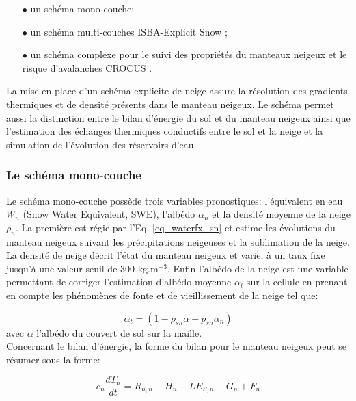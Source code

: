 \begin{itemize}
\item[$\bullet$] un schéma mono-couche;
\medbreak
\item[$\bullet$] un schéma multi-couches ISBA-Explicit Snow \citep[ES,][]{boone2001};
\medbreak
\item[$\bullet$] un schéma complexe pour le suivi des propriétés du manteaux neigeux et le risque d'avalanches CROCUS \citep{vionnet2012}.
\end{itemize}
\medbreak
La mise en place d'un schéma explicite de neige assure la résolution des gradients thermiques et de densité présents dans le manteau neigeux. Le schéma permet aussi la distinction entre le bilan d'énergie du sol et du manteau neigeux ainsi que l'estimation des échanges thermiques conductifs entre le sol et la neige et la simulation de l'évolution des réservoirs d'eau.

\subsubsection{\selectfont Le schéma mono-couche}

Le schéma mono-couche possède trois variables pronostiques: l'équivalent en eau $W_{n}$ (Snow Water Equivalent, SWE), l'albédo $\alpha_{n}$ et la densité moyenne de la neige $\rho_{n}$.
La première est régie par l'Eq. \eqref{eq_waterfx_sn} et estime les évolutions du manteau neigeux  suivant les précipitations neigeuses et la sublimation de la neige. La densité de neige décrit l'état du manteau neigeux et varie, à un taux fixe \citep{verseghy1991} jusqu'à une valeur seuil de 300 kg.m$^{-3}$. Enfin l'albédo de la neige est une variable permettant de corriger l'estimation d'albédo moyenne $\alpha_{t}$ sur la cellule en prenant en compte les phénomènes de fonte et de vieillissement de la neige tel que:

\begin{equation}
\alpha_{t} = (1-\rho_{sn}\alpha + p_{sn}\alpha_{n})
\end{equation}
avec $\alpha$ l'albédo du couvert de sol sur la maille.\\

\noindent Concernant le bilan d'énergie, la forme du bilan pour le manteau neigeux peut se résumer sous la forme:

\begin{equation}
c_{n} \frac{dT_{n}}{dt} = R_{n,n} - H_{n} - LE_{S,n} - G_{n} + F_{n}
\end{equation}

